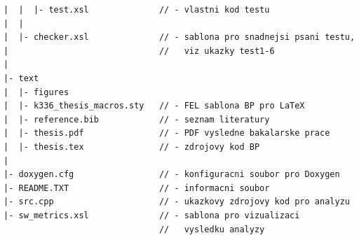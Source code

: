 \documentclass[11pt,twoside,a4paper]{book}
\begin{document}
\begin{verbatim}
|  |  |- test.xsl              // - vlastni kod testu
|  |
|  |- checker.xsl              // - sablona pro snadnejsi psani testu,
|                              //   viz ukazky test1-6
|
|- text
|  |- figures
|  |- k336_thesis_macros.sty   // - FEL sablona BP pro LaTeX
|  |- reference.bib            // - seznam literatury
|  |- thesis.pdf               // - PDF vysledne bakalarske prace
|  |- thesis.tex               // - zdrojovy kod BP
|
|- doxygen.cfg                 // - konfiguracni soubor pro Doxygen
|- README.TXT                  // - informacni soubor
|- src.cpp                     // - ukazkovy zdrojovy kod pro analyzu
|- sw_metrics.xsl              // - sablona pro vizualizaci
                               //   vysledku analyzy
\end{verbatim}
\end{document}
